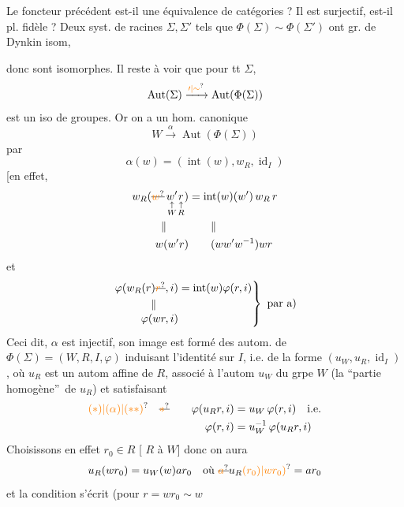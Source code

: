 Le foncteur précédent est-il une équivalence de catégories ? Il est   surjectif, est-il pl. fidèle ? Deux syst. de racines $\Sigma,\Sigma'$ tels que $\Phi(\Sigma)\sim\Phi(\Sigma')$ ont  gr. de Dynkin isom,

donc sont isomorphes. Il reste à voir que pour tt $\Sigma$,
\[
\operatorname{Aut}(\Sigma)\xrightarrow{\unsure{\prime|\sim}}\operatorname{Aut}(\Phi(\Sigma))
\]
est un iso de groupes. Or on a un hom. canonique
\[
W\xrightarrow{\alpha}\operatorname{Aut}(\Phi(\Sigma))
\]
par
\[
\alpha(w)=(\operatorname{int}(w),w_R,\operatorname{id}_I)
\]
[en effet,
\[
\begin{aligned}
w_R(\deleted{\unsure{w}}\,\underset{\substack{\uparrow\\W}}{w'}\underset{\substack{\uparrow\\R}}{r})&=\operatorname{int}(w)(w')\,w_R\,r\\
\Vert\qquad &\qquad\Vert\\
w(w'r)&\qquad(ww'w^{-1})wr
\end{aligned}
\]
et
\[
\left.\begin{aligned}
\varphi(w_R(r)\deleted{\unsure{r}},i)&=\operatorname{int}(w)\varphi(r,i)\\
\Vert\qquad &\\[-2pt]
\varphi(wr,i)&
\end{aligned}\right\}\ \text{par a)}
\]
Ceci dit, $\alpha$ est  injectif, son image est formé des autom.  de $\Phi(\Sigma)=(W,R,I,\varphi)$ induisant l'identité sur $I$, i.e. de la forme $(u_W,u_R,\operatorname{id}_I)$, où $u_R$ est un autom affine de $R$, associé à l'autom $u_W$ du grpe $W$ (la \textquotedblleft partie homogène\textquotedblright\ de $u_R$) et satisfaisant
\[
\begin{aligned}
\unsure{(*)|(\alpha)|(\ast\ast)}\quad \deleted{\unsure{*}}\qquad
\varphi(u_Rr,i)&=u_W\,\varphi(r,i)\quad\text{i.e.}\\
\varphi(r,i)&=u_W^{-1}\,\varphi(u_Rr,i)
\end{aligned}
\]
Choisissons en effet $r_0\in R$ [  $R$ à $W$] donc on aura
\[
u_R(wr_0)=u_W(w)ar_0\quad\text{où }\deleted{\unsure{a}}u_R\unsure{(r_0)|wr_0)}=ar_0
\]
et la condition \unsure{$(*)$|$(\alpha)$|$(\ast\ast)$}  s'écrit (pour $r=wr_0\sim w$

